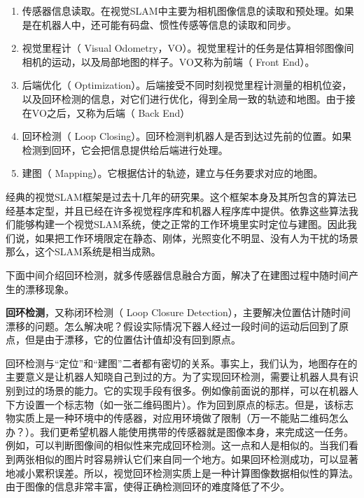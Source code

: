 \begin{enumerate}

\item 传感器信息读取。在视觉SLAM中主要为相机图像信息的读取和预处理。如果是在机器人中，还可能有码盘、惯性传感等信息的读取和同步。

\item 视觉里程计（ Visual Odometry，VO）。视觉里程计的任务是估算相邻图像间相机的运动，以及局部地图的样子。VO又称为前端（ Front End）。

\item 后端优化（ Optimization）。后端接受不同时刻视觉里程计测量的相机位姿，以及回环检测的信息，对它们进行优化，得到全局一致的轨迹和地图。由于接在VO之后，又称为后端（ Back End）

\item 回环检测（ Loop Closing）。回环检测判机器人是否到达过先前的位置。如果检测到回环，它会把信息提供给后端进行处理。

\item 建图（ Mapping）。它根据估计的轨迹，建立与任务要求对应的地图。

\end{enumerate}

经典的视觉SLAM框架是过去十几年的研究果。这个框架本身及其所包含的算法已经基本定型，并且已经在许多视觉程序库和机器人程序库中提供。依靠这些算法我们能够构建一个视觉SLAM系统，使之正常的工作环境里实时定位与建图。因此我们说，如果把工作环境限定在静态、刚体，光照变化不明显、没有人为干扰的场景那么，这个SLAM系统是相当成熟。

下面中间介绍回环检测，就多传感器信息融合方面，解决了在建图过程中随时间产生的漂移现象。

\textbf{回环检测}，又称闭环检测（ Loop Closure Detection），主要解决位置估计随时间漂移的问题。怎么解决呢？假设实际情况下器人经过一段时间的运动后回到了原点，但是由于漂移，它的位置估计值却没有回到原点。

回环检测与“定位”和“建图”二者都有密切的关系。事实上，我们认为，地图存在的主要意义是让机器人知晓自己到过的方。为了实现回环检测，需要让机器人具有识别到过的场景的能力。它的实现手段有很多。例如像前面说的那样，可以在机器人下方设置一个标志物（如一张二维码图片）。作为回到原点的标志。但是，该标志物实质上是一种环境中的传感器，对应用环境做了限制（万一不能贴二维码怎么办？）。我们更希望机器人能使用携带的传感器就是图像本身，来完成这一任务。例如，可以判断图像间的相似性来完成回环检测。这一点和人是相似的。当我们看到两张相似的图片时容易辨认它们来自同一个地方。如果回环检测成功，可以显著地减小累积误差。所以，视觉回环检测实质上是一种计算图像数据相似性的算法。由于图像的信息非常丰富，使得正确检测回环的难度降低了不少。

